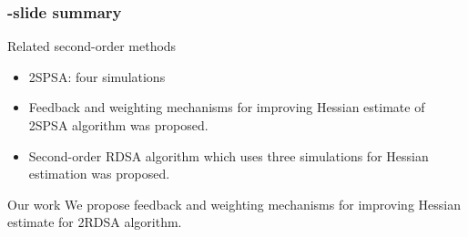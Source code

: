
\begin{frame}
\begin{small}
\frametitle{-slide summary}
\begin{block}{Related second-order methods}
\begin{itemize}
\item 2SPSA\footnotemark[1]: four simulations 
\item Feedback and weighting mechanisms for improving Hessian estimate of 2SPSA algorithm  was proposed.
\item Second-order RDSA algorithm which uses three simulations for Hessian estimation was proposed.
\end{itemize}
\end{block}
\begin{block}{Our work}
We propose feedback and weighting mechanisms for improving Hessian estimate for 2RDSA algorithm.
\end{block}
\end{small}
\end{frame}












